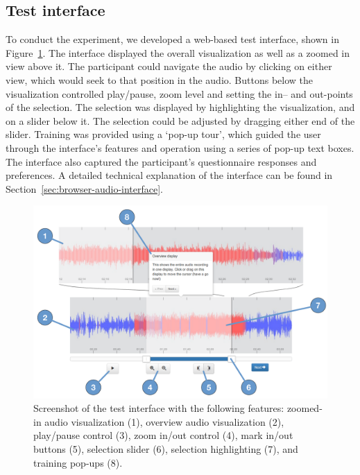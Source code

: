 \subsection{Test interface}
To conduct the experiment, we developed a web-based test interface, shown in Figure~\ref{fig:visualization-interface}.
The interface displayed the overall visualization as well as a zoomed in view above it. The participant could navigate
the audio by clicking on either view, which would seek to that position in the audio.  Buttons below the visualization
controlled play/pause, zoom level and setting the in-- and out-points of the selection.  The selection was displayed by
highlighting the visualization, and on a slider below it. The selection could be adjusted by dragging either end of the
slider.  Training was provided using a `pop-up tour', which guided the user through the interface's features and
operation using a series of pop-up text boxes.  The interface also captured the participant's questionnaire responses
and preferences.  A detailed technical explanation of the interface can be found in
Section~\ref{sec:browser-audio-interface}.

\begin{figure}[ht]
\centering
\includegraphics[width=\columnwidth]{figs/browser-audio-interface.pdf}
\caption{Screenshot of the test interface with the following features:
zoomed-in audio visualization (1),
overview audio visualization (2),
play/pause control (3),
zoom in/out control (4),
mark in/out buttons (5),
selection slider (6),
selection highlighting (7),
and training pop-ups (8).}
\label{fig:visualization-interface}
\end{figure}



